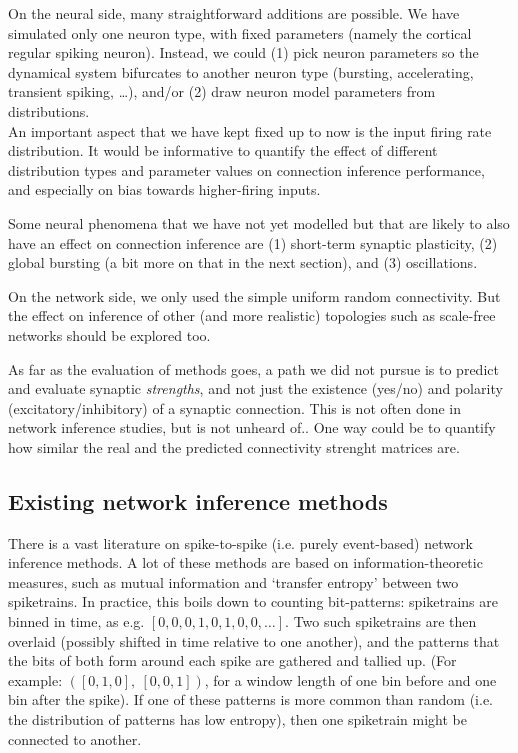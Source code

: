 On the neural side, many straightforward additions are possible. We have simulated only one neuron type, with fixed parameters (namely the cortical regular spiking neuron). Instead, we could (1) pick neuron parameters so the dynamical system bifurcates to another neuron type (bursting, accelerating, transient spiking, …)\cite{Naud2008FiringPatternsAdaptive}, and/or (2) draw neuron model parameters from distributions.\\
An important aspect that we have kept fixed up to now is the input firing rate distribution. It would be informative to quantify the effect of different distribution types and parameter values on connection inference performance, and especially on bias towards higher-firing inputs.

Some neural phenomena that we have not yet modelled but that are likely to also have an effect on connection inference are (1) short-term synaptic plasticity, (2) global bursting (a bit more on that in the next section), and (3) oscillations.

On the network side, we only used the simple uniform random connectivity. But the effect on inference of other (and more realistic) topologies such as scale-free networks should be explored too.

As far as the evaluation of methods goes, a path we did not pursue is to predict and evaluate synaptic \emph{strengths}, and not just the existence (yes/no) and polarity (excitatory/inhibitory) of a synaptic connection. This is not often done in network inference studies, but is not unheard of.\cite{Zhang2017SpikeTriggeredRegressionSynaptic}.
One way could be to quantify how similar the real and the predicted connectivity strenght matrices are.


\subsection{Existing network inference methods}

There is a vast literature on spike-to-spike (i.e. purely event-based) network inference methods. A lot of these methods are based on information-theoretic measures, such as mutual information and `transfer entropy' between two spiketrains. In practice, this boils down to counting bit-patterns: spiketrains are binned in time, as e.g. $[0, 0, 0, 1, 0, 1, 0, 0, …]$. Two such spiketrains are then overlaid (possibly shifted in time relative to one another), and the patterns that the bits of both form around each spike are gathered and tallied up. (For example: $([0,1,0],\ [0,0,1])$, for a window length of one bin before and one bin after the spike). If one of these patterns is more common than random (i.e. the distribution of patterns has low entropy), then one spiketrain might be connected to another.

